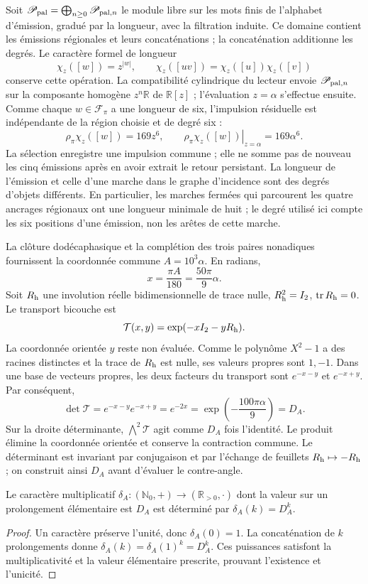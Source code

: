 Soit \(\mathscr P_{\rm pal}=\bigoplus_{n\ge0}\mathscr P_{{\rm pal},n}\) le module libre
sur les mots finis de l’alphabet d’émission, gradué par la longueur,
avec la filtration induite. Ce domaine contient les émissions régionales
et leurs concaténations ; la concaténation additionne les degrés. Le caractère
formel de longueur
\[
 \chi_z([w])=z^{|w|},\qquad
 \chi_z([uv])=\chi_z([u])\chi_z([v])
\]
conserve cette opération. La compatibilité cylindrique du lecteur envoie
\(\mathscr P_{{\rm pal},n}\) sur la composante homogène \(z^n\mathbb R\) de
\(\mathbb R[z]\) ; l’évaluation \(z=\alpha\) s’effectue ensuite.
Comme chaque \(w\in\mathcal F_\pi\) a une longueur de six, l’impulsion
résiduelle est indépendante de la région choisie et de degré six :
\[
 \rho_\pi\chi_z([w])=169z^6,
 \qquad\left.\rho_\pi\chi_z([w])\right|_{z=\alpha}=169\alpha^6.
\]
La sélection enregistre une impulsion commune ; elle ne somme pas de nouveau les cinq
émissions après en avoir extrait le retour persistant.
La longueur de l’émission et celle d’une marche dans le graphe
d’incidence sont des degrés d’objets différents. En particulier, les marches
fermées qui parcourent les quatre ancrages régionaux ont une longueur
minimale de huit ; le degré utilisé ici compte les six positions d’une
émission, non les arêtes de cette marche.

La clôture dodécaphasique et la complétion des trois paires nonadiques
fournissent la coordonnée commune \(A=10^3\alpha\). En radians,
\[
 x=\frac{\pi A}{180}=\frac{50\pi}{9}\alpha.
\]
Soit \(R_{\rm h}\) une involution réelle bidimensionnelle de trace nulle,
\(R_{\rm h}^2=I_2\), \(\operatorname{tr}R_{\rm h}=0\). Le transport bicouche est
\[
 \mathcal T(x,y)=\exp(-xI_2-yR_{\rm h}).
\]
La coordonnée orientée \(y\) reste non évaluée. Comme le polynôme
\(X^2-1\) a des racines distinctes et la trace de \(R_{\rm h}\) est nulle,
ses valeurs propres sont \(1,-1\). Dans une base de vecteurs propres, les deux
facteurs du transport sont \(e^{-x-y}\) et \(e^{-x+y}\). Par conséquent,
\[
 \det\mathcal T=e^{-x-y}e^{-x+y}=e^{-2x}
 =\exp\!\left(-\frac{100\pi\alpha}{9}\right)=D_A.
\]
Sur la droite déterminante, \(\bigwedge^2\mathcal T\) agit comme
\(D_A\) fois l’identité. Le produit élimine la coordonnée orientée et conserve la contraction
commune. Le déterminant est invariant par conjugaison et par
l’échange de feuillets \(R_{\rm h}\mapsto-R_{\rm h}\) ; on construit ainsi \(D_A\)
avant d’évaluer le contre-angle.

\begin{proposition}
\label{prop:accion-caracter-determinantal}
Le caractère multiplicatif \(\delta_A:(\mathbb N_0,+)\to(\mathbb R_{>0},\cdot)\)
dont la valeur sur un prolongement élémentaire est \(D_A\) est déterminé
par \(\delta_A(k)=D_A^k\).
\end{proposition}
\begin{proof}
Un caractère préserve l’unité, donc \(\delta_A(0)=1\).
La concaténation de \(k\) prolongements donne
\(\delta_A(k)=\delta_A(1)^k=D_A^k\). Ces puissances satisfont
la multiplicativité et la valeur élémentaire prescrite, prouvant l’existence
et l’unicité.
\end{proof}

